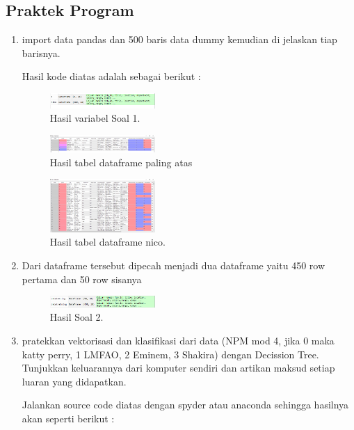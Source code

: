 \subsection{Praktek Program}
\begin{enumerate}
	\item import data pandas dan 500 baris data dummy kemudian di jelaskan tiap barisnya.
	\hfill\break
	
	Hasil kode diatas adalah sebagai berikut :
	\begin{figure}[H]
	\centering
		\includegraphics[width=4cm]{figures/1174096/tugas4/hasil1.1.PNG}
		\caption{Hasil variabel Soal 1.}
	\end{figure}
    \begin{figure}[H]
	\centering
		\includegraphics[width=4cm]{figures/1174096/tugas4/hasil1.2.PNG}
		\caption{Hasil tabel dataframe paling atas}
	\end{figure}
    \begin{figure}[H]
	\centering
		\includegraphics[width=4cm]{figures/1174096/tugas4/hasil1.3.PNG}
		\caption{Hasil tabel dataframe nico.}
	\end{figure}

	\item Dari dataframe tersebut dipecah menjadi dua dataframe yaitu 450 row pertama dan 50 row sisanya
	\hfill\break
	
	
	\begin{figure}[H]
	\centering
		\includegraphics[width=4cm]{figures/1174096/tugas4/hasil2.PNG}
		\caption{Hasil Soal 2.}
	\end{figure}

	\item  pratekkan vektorisasi dan klasiﬁkasi dari data (NPM mod 4, jika 0 maka katty perry, 1 LMFAO, 2 Eminem, 3 Shakira) dengan Decission Tree. Tunjukkan keluarannya dari komputer sendiri dan artikan maksud setiap luaran yang didapatkan.
	\hfill\break
	
	Jalankan source code diatas dengan spyder atau anaconda sehingga hasilnya akan seperti berikut : 


\end{enumerate}
